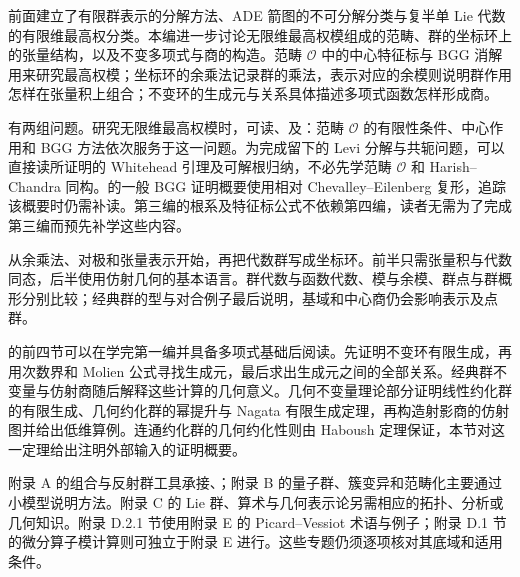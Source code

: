 
\BookPartGuide
前面建立了有限群表示的分解方法、ADE 箭图的不可分解分类与复半单 Lie 代数的有限维最高权分类。本编进一步讨论无限维最高权模组成的范畴、群的坐标环上的张量结构，以及不变多项式与商的构造。范畴 \(\mathcal O\) 中的中心特征标与 BGG 消解用来研究最高权模；坐标环的余乘法记录群的乘法，表示对应的余模则说明群作用怎样在张量积上组合；不变环的生成元与关系具体描述多项式函数怎样形成商。

\ProseParagraphBreak
{}有两组问题。研究无限维最高权模时，可读、及：范畴 \(\mathcal O\) 的有限性条件、中心作用和 BGG 方法依次服务于这一问题。为完成留下的 Levi 分解与共轭问题，可以直接读所证明的 Whitehead 引理及可解根归纳，不必先学范畴 \(\mathcal O\) 和 Harish--Chandra 同构。的一般 BGG 证明概要使用相对 Chevalley--Eilenberg 复形，追踪该概要时仍需补读。第三编的根系及特征标公式不依赖第四编，读者无需为了完成第三编而预先补学这些内容。

\ProseParagraphBreak
{}从余乘法、对极和张量表示开始，再把代数群写成坐标环。前半只需张量积与代数同态，后半使用仿射几何的基本语言。群代数与函数代数、模与余模、群点与群概形分别比较；经典群的型与对合例子最后说明，基域和中心商仍会影响表示及点群。

\ProseParagraphBreak
{}的前四节可以在学完第一编并具备多项式基础后阅读。先证明不变环有限生成，再用次数界和 Molien 公式寻找生成元，最后求出生成元之间的全部关系。经典群不变量与仿射商随后解释这些计算的几何意义。几何不变量理论部分证明线性约化群的有限生成、几何约化群的幂提升与 Nagata 有限生成定理，再构造射影商的仿射图并给出低维算例。连通约化群的几何约化性则由 Haboush 定理保证，本节对这一定理给出注明外部输入的证明概要。

\ProseParagraphBreak
附录 A 的组合与反射群工具承接、；附录 B 的量子群、簇变异和范畴化主要通过小模型说明方法。附录 C 的 Lie 群、算术与几何表示论另需相应的拓扑、分析或几何知识。附录 D.2.1 节使用附录 E 的 Picard--Vessiot 术语与例子；附录 D.1 节的微分算子模计算则可独立于附录 E 进行。这些专题仍须逐项核对其底域和适用条件。




